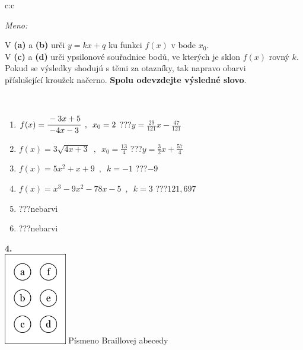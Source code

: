 \documentclass[10pt]{report}
\begin{document}
\begin{tabular}{c:c}
\begin{minipage}[c][104.5mm][t]{0.5\linewidth}
\begin{center}
\textit{Meno:}\phantom{xxxxxxxxxxxxxxxxxxxxxxxxxxxxxxxxxxxxxxxxxxxxxxxxxxxxxxxxxxxxxxxxx}\\[5mm]
\begin{minipage}{0.95\linewidth}
\begin{center}
V \textbf{(a)} a \textbf{(b)} urči  $y = kx + q$ ku funkci $f(x)$ v bode $x_0$.\\V \textbf{(c)} a \textbf{(d)} urči ypsilonové souřadnice bodů, ve kterých je sklon $f(x)$ rovný $k$.\\Pokud se výsledky shodujú s těmi za otazníky, tak napravo obarvi\\příslušející kroužek načerno. \textbf{Spolu odevzdejte výsledné slovo}.
\end{center}
\end{minipage}
\\[1mm]
\begin{minipage}{0.79\linewidth}
\begin{center}
\begin{varwidth}{\linewidth}
\begin{enumerate}
\small
\item $f(x)=\cfrac{-3x+5}{-4x-3}\enspace , \enspace x_0=2$\quad \dotfill\; ???\;\dotfill \quad $y = \frac{29}{121}x-\frac{47}{121}$
\item $f(x)=3\sqrt{4x+3}\enspace , \enspace x_0=\frac{13}{4}$\quad \dotfill\; ???\;\dotfill \quad $y = \frac{3}{2}x+\frac{57}{4}$
\item $f(x)=5x^2+x+9\enspace , \enspace k=-1$\quad \dotfill\; ???\;\dotfill \quad $-9$
\item $f(x)=x^3-9x^2-78x-5\enspace , \enspace k=3$\quad \dotfill\; ???\;\dotfill \quad $121 , 697$
\item \quad \dotfill\; ???\;\dotfill \quad nebarvi
\item \quad \dotfill\; ???\;\dotfill \quad nebarvi
\end{enumerate}
\end{varwidth}
\end{center}
\end{minipage}
\begin{minipage}{0.20\linewidth}
\begin{center}
{\Huge\bfseries 4.} \\[2mm]
\includegraphics[height=40mm]{../images/braille.png}
{\small Písmeno Braillovej abecedy}
\end{center}
\end{minipage}
\end{center}
\end{minipage}
%
\end{tabular}
\end{document}
